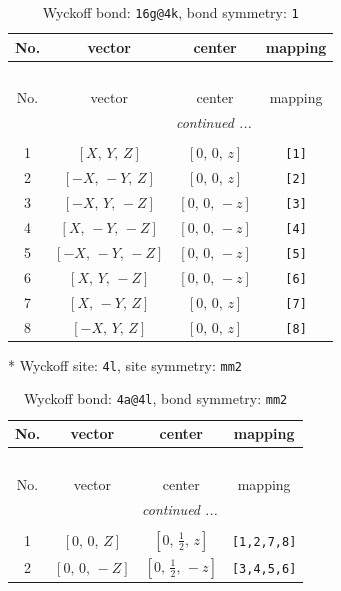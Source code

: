 \documentclass[fleqn,8pt]{jsarticle}
\begin{document}
\begin{longtable}{cccc}
\caption{Wyckoff bond: {\tt 16g@4k}, bond symmetry: {\tt 1}}
 \\
 \hline \hline
No. & vector & center & mapping \\ \hline \endfirsthead

\multicolumn{3}{l}{\tablename\ \thetable{}} \\
 \hline \hline
No. & vector & center & mapping \\ \hline \endhead

 \hline \hline
\multicolumn{3}{r}{\footnotesize\it continued ...} \\ \endfoot

 \hline \hline
\multicolumn{3}{r}{} \\ \endlastfoot

1 & $\left[ X,\, Y,\, Z \right]$ & $\left[ 0,\, 0,\, z \right]$ & {\tt [1]} \\ \hline
2 & $\left[ - X,\, - Y,\, Z \right]$ & $\left[ 0,\, 0,\, z \right]$ & {\tt [2]} \\ \hline
3 & $\left[ - X,\, Y,\, - Z \right]$ & $\left[ 0,\, 0,\, - z \right]$ & {\tt [3]} \\ \hline
4 & $\left[ X,\, - Y,\, - Z \right]$ & $\left[ 0,\, 0,\, - z \right]$ & {\tt [4]} \\ \hline
5 & $\left[ - X,\, - Y,\, - Z \right]$ & $\left[ 0,\, 0,\, - z \right]$ & {\tt [5]} \\ \hline
6 & $\left[ X,\, Y,\, - Z \right]$ & $\left[ 0,\, 0,\, - z \right]$ & {\tt [6]} \\ \hline
7 & $\left[ X,\, - Y,\, Z \right]$ & $\left[ 0,\, 0,\, z \right]$ & {\tt [7]} \\ \hline
8 & $\left[ - X,\, Y,\, Z \right]$ & $\left[ 0,\, 0,\, z \right]$ & {\tt [8]} \\
\end{longtable}
* Wyckoff site: {\tt 4l}, site symmetry: {\tt mm2}
\renewcommand{\arraystretch}{1.2}
\begin{longtable}{cccc}
\caption{Wyckoff bond: {\tt 4a@4l}, bond symmetry: {\tt mm2}}
 \\
 \hline \hline
No. & vector & center & mapping \\ \hline \endfirsthead

\multicolumn{3}{l}{\tablename\ \thetable{}} \\
 \hline \hline
No. & vector & center & mapping \\ \hline \endhead

 \hline \hline
\multicolumn{3}{r}{\footnotesize\it continued ...} \\ \endfoot

 \hline \hline
\multicolumn{3}{r}{} \\ \endlastfoot

1 & $\left[ 0,\, 0,\, Z \right]$ & $\left[ 0,\, \frac{1}{2},\, z \right]$ & {\tt [1,2,7,8]} \\ \hline
2 & $\left[ 0,\, 0,\, - Z \right]$ & $\left[ 0,\, \frac{1}{2},\, - z \right]$ & {\tt [3,4,5,6]} \\
\end{longtable}
\end{document}
